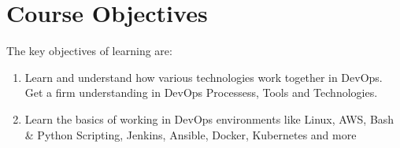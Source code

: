 
\section{Course Objectives}
The key objectives of learning \courseTitle are:
\begin{enumerate}
  \item Learn and understand how various technologies work together in DevOps. Get a firm understanding in DevOps Processess, Tools and Technologies.
  
  \item Learn the basics of working in DevOps environments like Linux, AWS, Bash \& Python Scripting, Jenkins, Ansible, Docker, Kubernetes and more
  
  
\end{enumerate}